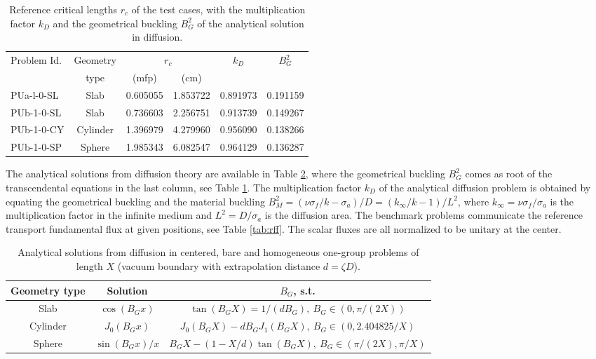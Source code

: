 \documentclass{ictt26}
\begin{document}
\begin{table}[htb]
\centering
\caption{Reference critical lengths $r_c$ of the test cases, with the multiplication factor $k_D$ and the geometrical buckling $B^2_G$ of the analytical solution in diffusion.}\label{tab:rc}
\begin{tabular}{l|c|c|c|c|c}
\multirow{2}{*}{Problem Id.} & Geometry & \multicolumn{2}{c|}{$r_c$}& \multirow{2}{*}{$k_D$} & \multirow{2}{*}{$B_G^2$}\\ \cline{3-4}
 & type & (mfp) & (cm) & & \\ \hline
PUa-l-0-SL  & Slab       & 0.605055     & 1.853722 & 0.891973 & 0.191159\\
PUb-1-0-SL  & Slab       & 0.736603   & 2.256751 & 0.913739 & 0.149267\\
PUb-1-0-CY  & Cylinder   & 1.396979     & 4.279960 & 0.956090 & 0.138266\\
PUb-1-0-SP  & Sphere     & 1.985343 & 6.082547 & 0.964129 & 0.136287\\
\end{tabular}
\end{table}

The analytical solutions from diffusion theory are available in Table \ref{tab:adsol}, where the geometrical buckling $B_G^2$ comes as root of the transcendental equations in the last column, see Table \ref{tab:rc}. The multiplication factor $k_D$ of the analytical diffusion problem is obtained by equating the geometrical buckling and the material buckling $B^2_M = (\nu\sigma_f/k - \sigma_a)/D = (k_\infty/k - 1)/L^2$, where $k_\infty = \nu\sigma_f / \sigma_a$ is the multiplication factor in the infinite medium and $L^2 = D/\sigma_a$ is the diffusion area. The benchmark problems communicate the reference transport fundamental flux at given positions, see Table \ref{tab:rff}. The scalar fluxes are all normalized to be unitary at the center.

\begin{table}[hbt]
\centering
\caption{Analytical solutions from diffusion in centered, bare and homogeneous one-group problems of length $X$ (vacuum boundary with extrapolation distance $d = \zeta D$).}\label{tab:adsol}
\begin{tabular}{c|c|c}
Geometry type & Solution & $B_G$, s.t.\\ \hline[1mm]
Slab & $\cos{(B_G x)}$ & $\tan{(B_G X)} = 1 / (d B_G), \: B_G \in (0, \pi /(2X))$\\[1mm]
Cylinder & $J_0 (B_G x)$ & $J_0(B_G X) - d B_G J_1(B_G X), \: B_G \in (0, 2.404825 / X)$ \\[1mm]
Sphere & $\sin{(B_G x)}/x$ & $B_G X - (1 - X / d) \tan{(B_G X)}, \: B_G \in (\pi/(2X), \pi/X)$ \\
\end{tabular}
\end{table}
\end{document}
